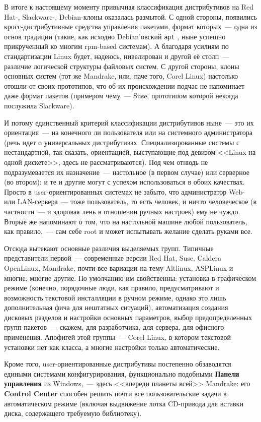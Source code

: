 В итоге к настоящему моменту привычная классификация дистрибутивов на Red Hat-, Slackware-, Debian-клоны оказалась размытой. С одной стороны, появились кросс-дистрибутивные средства управления пакетами, формат которых~--- одна из основ традиции (такие, как исходно Debian'овский 
\texttt{apt}
, ныне успешно прикрученный ко многим rpm-based системам). А благодаря усилиям по стандартизации Linux будет, надеюсь, нивелирован и другой её столп~--- различие логической структуры файловых систем. С другой стороны, клоны основных систем (тот же Mandrake, или, паче того, Corel Linux) настолько отошли от своих прототипов, что об их происхождении подчас не напоминает даже формат пакетов (примером чему~--- Suse, прототипом которой некогда послужила Slackware).

И потому единственный критерий классификации дистрибутивов ныне~--- это их ориентация~--- на конечного ли пользователя или на системного администратора (речь идет о универсальных дистрибутивах. Специализированные системы с нестандартной, так сказать, ориентацией, выступающие под девизом <<Linux на одной дискете>>, здесь не рассматриваются). Под чем отнюдь не подразумевается их назначение~--- настольное (в первом случае) или серверное (во втором): и те и другие могут с успехом использоваться в обоих качествах. Просто в user-ориентированных системах не забыто, что администратор Web- или LAN-сервера~--- тоже пользователь, то есть человек, и ничто человеческое (в частности~--- и здоровая лень в отношении ручных настроек) ему не чуждо. Вторые же напоминают о том, что на настольной машине любой пользователь, как правило,~--- сам себе root и может испытывать желание сделать руками все.

Отсюда вытекают основные различия выделяемых групп. Типичные представители первой~--- современные версии Red Hat, Suse, Caldera OpenLinux, Mandrake, почти все вариации на тему Altlinux, ASPLinux и многие, многие другие. По умолчанию им свойственны: установка в графическом режиме (конечно, порядочные люди, как правило, предусматривают и возможность текстовой инсталляции в ручном режиме, однако это лишь дополнительная фича для нештатных ситуаций), автоматизация создания дисковых разделов и настройки основных параметров, выбор предопределенных групп пакетов~--- скажем, для разработчика, для сервера, для офисного применения. Апофигей этой группы~--- Corel Linux, в котором текстовой установки нет как класса, а многие настройки только автоматические.

Кроме того, user-ориентированные дистрибутивы постепенно обзаводятся едиными системами конфигурирования, функционально подобными 
\textbf{Панели управления}
 из Windows,~--- здесь <<впереди планеты всей>> Mandrake: его 
\textbf{Control Center}
 способен решить почти все пользовательские задачи в автоматическом режиме (включая выдвижение лотка CD-привода для вставки диска, содержащего требуемую библиотеку).

